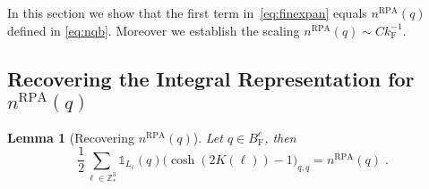 \documentclass[12pt,a4paper]{article}
\numberwithin{equation}{section}
\newcommand{\1}{\mathbb{I}}
\newcommand{\F}{\mathrm{F}}
\newcommand{\RPA}{\mathrm{RPA}}
\newcommand{\Z}{\mathbb{Z}}
\newcommand{\half}{\frac{1}{2}}
\theoremstyle{plain}
\newtheorem{lemma}[theorem]{Lemma}
\theoremstyle{definition}
\theoremstyle{remark}
\theoremstyle{plain}
\theoremstyle{definition}
\theoremstyle{remark}
\begin{document}
In this section we show that the first term in~\eqref{eq:finexpan} equals $ n^{\RPA}(q) $ defined in \eqref{eq:nqb}. Moreover we establish the scaling $ n^{\RPA}(q) \sim C k_{\F}^{-1} $.


\subsection{Recovering the Integral Representation for $ n^{\RPA}(q) $}\label{subsec:integralrep}

\begin{lemma}[Recovering $ n^{\RPA}(q) $] \label{lem:nqb_integralrecovery}
Let $q \in B^c_{\F}$, then
\begin{equation} \label{eq:nqb_integralrecovery}
	\half\sum_{\ell\in \Z^3_*}\mathds{1}_{L_\ell}(q) \big( \cosh(2K(\ell)) - 1 \big)_{q,q} = n^{\RPA}(q)\;.
\end{equation}
\end{lemma}
\end{document}
